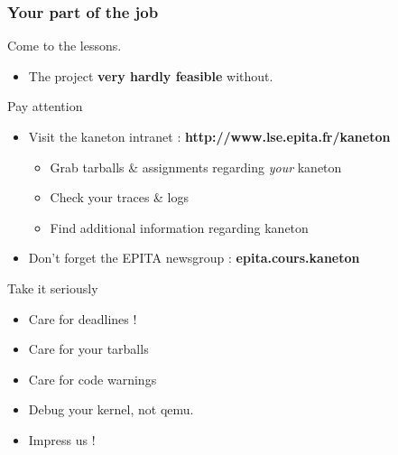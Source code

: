 \begin{frame}
  \frametitle{Your part of the job}

  {\Large Come to the lessons.} \\
  \begin{itemize}
  \item The project \textbf{very hardly feasible} without.
  \end{itemize}

  \-

  {\Large Pay attention}

  \begin{itemize}
  \item Visit the kaneton intranet : \textbf{http://www.lse.epita.fr/kaneton}
    \begin{itemize}
    \item Grab tarballs \& assignments regarding \textit{your} kaneton
    \item Check your traces \& logs
    \item Find additional information regarding kaneton
    \end{itemize}
  \item Don't forget the EPITA newsgroup : \textbf{epita.cours.kaneton}
  \end{itemize}

  \-

  {\Large Take it seriously}
  \begin{itemize}
  \item Care for deadlines !
  \item Care for your tarballs
  \item Care for code warnings
  \item Debug your kernel, not qemu.
  \item Impress us !
  \end{itemize}

\end{frame}


